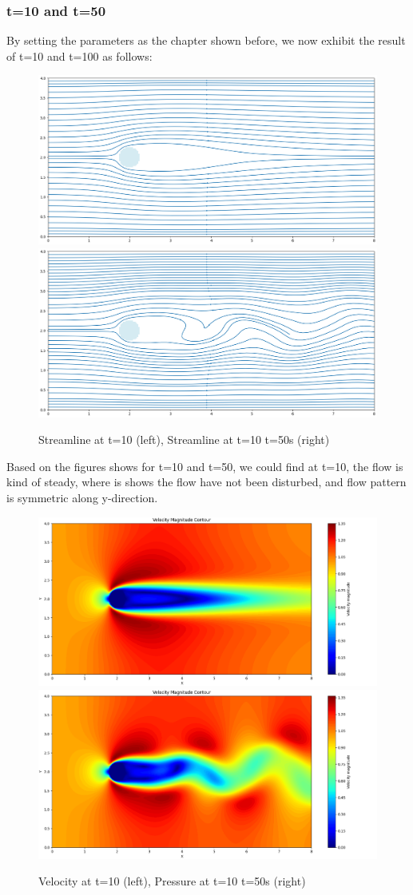 \documentclass[12pt]{article}
\begin{document}
\subsubsection{t=10 and t=50}
By setting the parameters as the chapter shown before, we now exhibit the result of t=10 and t=100 as follows:

\begin{figure}[H]
    \centering
    \includegraphics[width=0.45\linewidth]{figure/N32_Re150_8x4_t10/stline_N32_Re150_8x4_t10.jpg}
    \includegraphics[width=0.45\linewidth]{figure/N32_Re150_8x4_t50/stline_N32_Re150_8x4_t50.jpg}
    \caption{Streamline at t=10 (left), Streamline at t=10 t=50s (right)}
\end{figure}


Based on the figures shows for t=10 and t=50, we could find at t=10, the flow is kind of steady, where is shows the flow have not been disturbed, and flow pattern is symmetric along y-direction.

\begin{figure}[H]
    \centering
    \includegraphics[width=0.45\linewidth]{figure/N32_Re150_8x4_t10/v_N32_Re150_8x4_t10.jpg}
    \includegraphics[width=0.45\linewidth]{figure/N32_Re150_8x4_t50/v_N32_Re150_8x4_t50.jpg}
    \caption{Velocity at t=10 (left), Pressure at t=10 t=50s (right)}
\end{figure}
\end{document}

